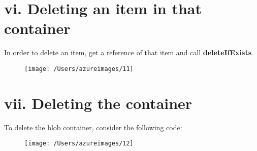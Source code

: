 \documentclass[12pt, letterpaper, twoside]{article}
\begin{document}
\cleardoublepage 		
\section*{vi. Deleting an item in that container}
In order to delete an item, get a reference of that item and call \textbf{deleteIfExists}.
\begin{figure}[H]
	\centering
	\texttt{[image: /Users/azureimages/11]}
\end{figure}
 \section*{vii. Deleting the container}	
 To delete the blob container, consider the following code:	
 \begin{figure}[H]
 	\centering
 	\texttt{[image: /Users/azureimages/12]}
 \end{figure}
 		
\end{document}
